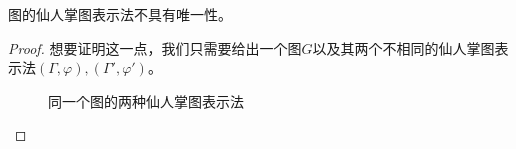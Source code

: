 \begin{lemma}
  \label{cactusnonunique}
  图的仙人掌图表示法不具有唯一性。
\end{lemma}
\begin{proof}
  想要证明这一点，我们只需要给出一个图$G$以及其两个不相同的仙人掌图表示法$(\Gamma,\varphi),(\Gamma',\varphi')$。
  \begin{figure}[htb]
    \centering
    \hspace{4em}
    \hspace{4em}
    \caption{同一个图的两种仙人掌图表示法}
\end{figure}


\end{proof}
